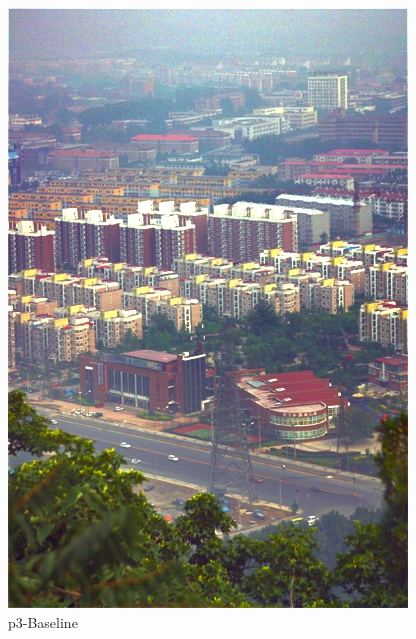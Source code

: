 \documentclass[12pt]{article}
\begin{document}
\begin{figure}[!h]
\begin{minipage}[t]{0.24\linewidth}
        \includegraphics[width=0.9\linewidth]{sample_pictures/after_p3_Baseline.jpg}
        \caption*{p3-Baseline}
    \end{minipage}
    \begin{minipage}[t]{0.24\linewidth}
        \centering

\end{minipage}
\end{figure}
\end{document}
